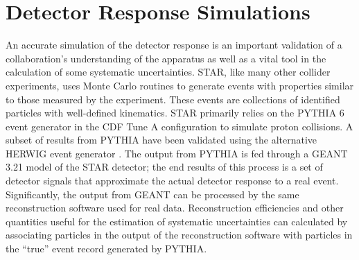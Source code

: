 \section{Detector Response Simulations}

An accurate simulation of the detector response is an important validation of a collaboration's understanding of the apparatus as well as a vital tool in the calculation of some systematic uncertainties. STAR, like many other collider experiments, uses Monte Carlo routines to generate events with properties similar to those measured by the experiment.  These events are collections of identified particles with well-defined kinematics.  STAR primarily relies on the PYTHIA 6 event generator \cite{Sjostrand:2006za} in the CDF Tune A \cite{Field:2005sa} configuration to simulate proton collisions.  A subset of results from PYTHIA have been validated using the alternative HERWIG event generator \cite{Corcella:2000bw}.  The output from PYTHIA is fed through a GEANT 3.21 \cite{GEANT321} model of the STAR detector; the end results of this process is a set of detector signals that approximate the actual detector response to a real event.  Significantly, the output from GEANT can be processed by the same reconstruction software used for real data.  Reconstruction efficiencies and other quantities useful for the estimation of systematic uncertainties can calculated by associating particles in the output of the reconstruction software with particles in the ``true'' event record generated by PYTHIA.
